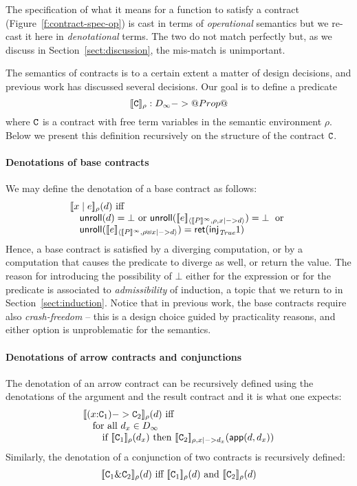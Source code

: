 The specification of what it means for a function to satisfy a
contract (Figure~\ref{f:contract-spec-op}) is cast in terms of
\emph{operational} semantics but we re-cast it here in \emph{denotational} terms.
The two do not match perfectly but, as we discuss in Section~\ref{sect:discussion}, 
the mis-match is unimportant.


The semantics of contracts is to a certain extent a matter of design decisions, and previous
work has discussed several decisions. Our goal is to define a predicate 
\[              [\![{\tt C}]\!]_\rho : D_\infty -> @Prop@   \]
where ${\tt C}$ is a contract with free term variables in the semantic environment $\rho$. Below
we present this definition recursively on the structure of the contract ${\tt C}$.

\paragraph{Denotations of base contracts}
We may define the denotation of a base contract as follows: 
\[\begin{array}{l}
    \dbrace{x \mid e}_\rho(d) \text{ iff } \\
        \quad \unroll(d) = \bot \text{ or } 
        \unroll(\interp{e}{\dbrace{P}^\infty}{\rho,x|->d}) = \bot\;\text{ or } \\
        \quad \unroll(\interp{e}{\dbrace{P}^\infty}{\rho \uplus x|->d}) = \ret(\inj{\True} 1) 
\end{array}\] 
Hence, a base contract is satisfied by a diverging computation, or by a computation that causes the 
predicate to diverge as well, or return the \True value. The reason for introducing the possibility of
$\bot$ either for the expression or for the predicate is associated to {\em admissibility} of induction, 
a topic that we return to in Section~\ref{sect:induction}. Notice that in previous work, the base 
contracts require also {\em crash-freedom} -- this is a design choice guided by practicality reasons, 
and either option is unproblematic for the semantics. 

\paragraph{Denotations of arrow contracts and conjunctions} 
The denotation of an arrow contract can be recursively defined using the denotations of the argument
and the result contract and it is what one expects: 
\[\begin{array}{l}
    [\![(x{:}{\tt C}_1) -> {\tt C}_2]\!]_{\rho}(d) \mbox{ iff } \\
        \quad \mbox{for all } d_x \in D_\infty \\ 
        \quad\quad \mbox{if }
                     [\![{\tt C}_1]\!]_\rho(d_x)\mbox{ then }
                     [\![{\tt C}_2]\!]_{\rho,x|->d_x}(\mathsf{app}(d,d_x)) 
\end{array}\]
Similarly, the denotation of a conjunction of two contracts is recursively defined:
\[\begin{array}{l}
    [\![{\tt C}_1 \& {\tt C}_2]\!]_\rho(d) \mbox{ iff } 
       [\![{\tt C}_1]\!]_\rho(d) \mbox{ and } 
       [\![{\tt C}_2]\!]_\rho(d)
\end{array}\]

